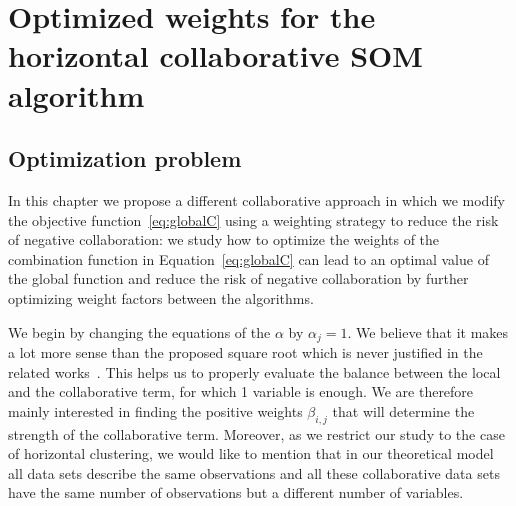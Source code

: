 



\section{Optimized weights for the horizontal collaborative SOM algorithm}
\label{sec:opt-w}

\subsection{Optimization problem}

In this chapter we  propose a different collaborative approach in which we modify the objective function~\eqref{eq:globalC} using a  
weighting  strategy to reduce the risk of negative collaboration: we study how to optimize the weights of the combination function in Equation~\eqref{eq:globalC} can lead to an optimal  value of the global function and reduce the risk of negative collaboration by further optimizing weight factors between the algorithms.

We begin by changing the equations of the $\alpha$ by $\alpha_j=1$. We believe that it makes a lot more sense than the proposed square root which is never justified in the related works~\cite{grozavu2010topological,grozavu2011learning}. This helps us to properly evaluate the balance between the local and the collaborative term, for which 1 variable is enough.
We are therefore mainly interested in finding the positive weights $\beta_{i,j}$ that will determine the strength of the collaborative term. 
Moreover, as we restrict our study to the case of horizontal clustering, we would like to mention that in our theoretical model all data sets describe the same observations and all these collaborative data sets have the same number of observations but a different number of variables.  



